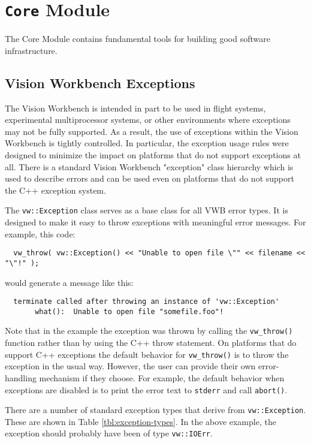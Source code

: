 \chapter{{\tt Core} Module}
\label{ch:core-module}

The Core Module contains fundamental tools for building good software infrastructure.

 \section{Vision Workbench Exceptions}
\label{sec:exceptions}

The Vision Workbench is intended in part to be used in flight systems,
experimental multiprocessor systems, or other environments where
exceptions may not be fully supported.  As a result, the use of
exceptions within the Vision Workbench is tightly controlled.  In
particular, the exception usage rules were designed to minimize the
impact on platforms that do not support exceptions at all.  There is a
standard Vision Workbench "exception" class hierarchy which is used to
describe errors and can be used even on platforms that do not support
the C++ exception system.

The \verb#vw::Exception# class serves as a base class for all VWB error
types.  It is designed to make it easy to throw exceptions with
meaningful error messages.  For example, this code:

\begin{verbatim}
  vw_throw( vw::Exception() << "Unable to open file \"" << filename << "\"!" );
\end{verbatim}

would generate a message like this:

\begin{verbatim}
  terminate called after throwing an instance of 'vw::Exception'
       what():  Unable to open file "somefile.foo"!
\end{verbatim}

Note that in the example the exception was thrown by calling the
\verb#vw_throw()# function rather than by using the C++ throw
statement.  On platforms that do support C++ exceptions the default
behavior for \verb#vw_throw()# is to throw the exception in the usual
way.  However, the user can provide their own error-handling mechanism
if they choose.  For example, the default behavior when exceptions are
disabled is to print the error text to \verb#stderr# and call
\verb#abort()#.

There are a number of standard exception types that derive from
\verb#vw::Exception#.  These are shown in Table
\ref{tbl:exception-types}.  In the above example, the exception should
probably have been of type \verb#vw::IOErr#.

